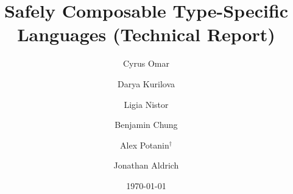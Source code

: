\documentclass[12pt]{article}
\title{Safely Composable Type-Specific Languages (Technical Report)}
\author{Cyrus Omar \and Darya Kurilova \and Ligia Nistor \and Benjamin Chung \and Alex Potanin$^{\dag}$ \and Jonathan Aldrich}
\date{\today}
\begin{document}
\renewcommand*{\thepage}{title-\arabic{page}} 
\maketitle
\renewcommand*{\thepage}{\arabic{page}} 
\appendix


\end{document}
